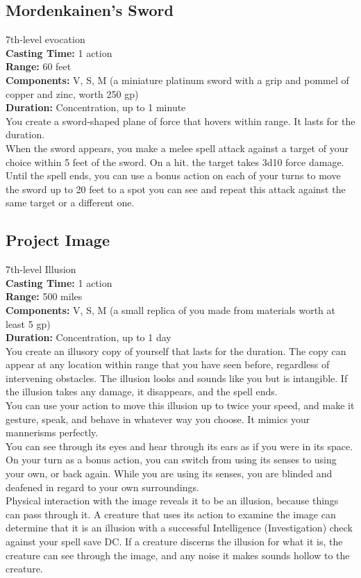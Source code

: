 \documentclass[11pt, A4paper, english]{article}
\begin{document}
		\subsection{Mordenkainen’s Sword}
7th-level evocation \\
\textbf{Casting Time:} 1 action \\
\textbf{Range:} 60 feet \\
\textbf{Components:} V, S, M (a miniature platinum sword with a grip and pommel of copper and zinc, worth 250 gp) \\
\textbf{Duration:} Concentration, up to 1 minute \\
You create a sword-shaped plane of force that hovers within range. It lasts for the duration. \\
When the sword appears, you make a melee spell attack against a target of your choice within 5 feet of the sword. On a hit. the target takes 3d10 force damage. Until the spell ends, you can use a bonus action on each of your turns to move the sword up to 20 feet to a spot you can see and repeat this attack against the same target or a different one.

		\subsection{Project Image}
7th-level Illusion \\
\textbf{Casting Time:} 1 action \\
\textbf{Range:} 500 miles \\
\textbf{Components:} V, S, M (a small replica of you made from materials worth at least 5 gp) \\
\textbf{Duration:} Concentration, up to 1 day \\
You create an illusory copy of yourself that lasts for the duration. The copy can appear at any location within range that you have seen before, regardless of intervening obstacles. The illusion looks and sounds like you but is intangible. If the illusion takes any damage, it disappears, and the spell ends. \\
You can use your action to move this illusion up to twice your speed, and make it gesture, speak, and behave in whatever way you choose. It mimics your mannerisms perfectly. \\
You can see through its eyes and hear through its ears as if you were in its space. On your turn as a bonus action, you can switch from using its senses to using your own, or back again. While you are using its senses, you are blinded and deafened in regard to your own surroundings. \\
Physical interaction with the image reveals it to be an illusion, because things can pass through it. A creature that uses its action to examine the image can determine that it is an illusion with a successful Intelligence (Investigation) check against your spell save DC. If a creature discerns the illusion for what it is, the creature can see through the image, and any noise it makes sounds hollow to the creature.
\end{document}

